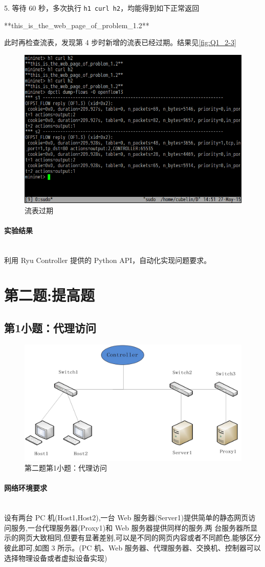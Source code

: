 \documentclass[format=draft,language=chinese,category=SDN]{hustreport}
\newcommand{\myparagraph}[1]{\paragraph{#1}\mbox{}\\}
\newcommand{\code}{\texttt}
\begin{document}
5. 等待 60 秒，多次执行 \code{h1 curl h2}，均能得到如下正常返回
\begin{center}
**this\_is\_the\_web\_page\_of\_problem\_1.2**
\end{center}
此时再检查流表，发现第 4 步时新增的流表已经过期。结果见\autoref{fig:Q1_2-3}

\begin{figure}[!h]
\centering
\includegraphics[width=.618\textwidth]{fig/1_2-3.png}
\caption{流表过期}\label{fig:Q1_2-3}
\end{figure}

\myparagraph{实验结果}
利用 Ryu Controller 提供的 Python API，自动化实现问题要求。

\clearpage

\section{第二题:提高题}\label{sec:Q2}
\subsection{第1小题：代理访问}\label{sec:Q2_1}

\begin{figure}[!h]
\centering
\includegraphics[width=.618\textwidth]{fig/2_1-0.png}
\caption{第二题第1小题：代理访问}\label{fig:Q2_1-0}
\end{figure}

\myparagraph{网络环境要求}
设有两台 PC 机(Host1,Host2),一台 Web 服务器(Server1)提供简单的静态网页访问服务,一台代理服务器(Proxy1)和 Web 服务器提供同样的服务,两
台服务器所显示的网页大致相同,但要有显著差别,可以是不同的网页内容或者不同颜色,能够区分彼此即可,如图 3 所示。(PC 机、Web 服务器、代理服务器、交换机、控制器可以选择物理设备或者虚拟设备实现)
\end{document}
